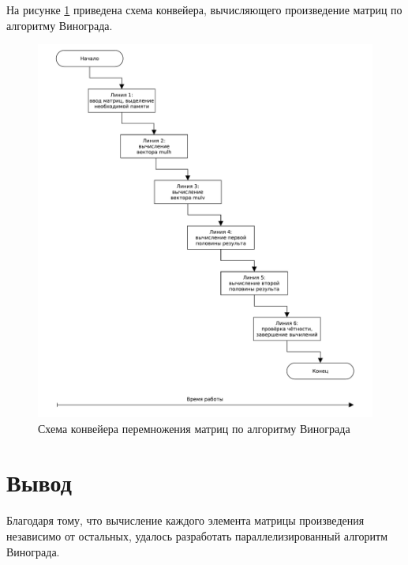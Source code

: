 На рисунке \ref{img:cwindograd} приведена схема конвейера, вычисляющего произведение матриц по алгоритму Винограда.

\begin{figure}[H]
    \centering
    \includegraphics[scale=0.5]{pdf/cwinograd.pdf}
    \caption{Схема конвейера перемножения матриц по алгоритму Винограда}
    \label{img:cwindograd}
\end{figure}

\section{Вывод}
Благодаря тому, что вычисление каждого элемента матрицы произведения независимо от остальных, удалось разработать параллелизированный алгоритм Винограда.

